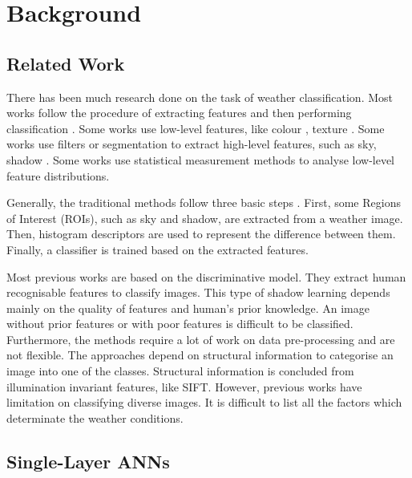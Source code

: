 
\chapter{Background} %
\label{Chapter2}

\section{Related Work}

There has been much research done on the task of weather classification. Most works follow the procedure of extracting features and then performing classification \citep{bishop1995neural,roser2008classification,serrano2002computationally,gokalp2007scene}.
Some works use low-level features, like colour \citep{szummer1998indoor}, texture \citep{shotton2009textonboost,vailaya2002automatic}. Some works use filters or segmentation \citep{boutell2004learning,shotton2009textonboost} to extract high-level features, such as sky, shadow \citep{lutwo}. Some works use statistical measurement methods \citep{he2014spatial,roser2008classification} to analyse low-level feature distributions.

Generally, the traditional methods follow three basic steps \citep{roser2008classification,yan2009weather}. First, some Regions of Interest (ROIs), such as sky and shadow,  are extracted from a weather image. Then, histogram descriptors are used to represent the difference between them. Finally, a classifier is trained based on the extracted features. 

Most previous works are based on the discriminative model. They extract human recognisable features to classify images. This type of shadow learning depends mainly on the quality of features and human's prior knowledge. An image without prior features or with poor features is difficult to be classified. Furthermore, the methods require a lot of work on data pre-processing and are not flexible. The approaches depend on structural information to categorise an image into one of the classes. Structural information is concluded from illumination invariant features, like SIFT. However, previous works have limitation on classifying diverse images. It is difficult to list all the factors which determinate the weather conditions.

\section{Single-Layer ANNs}

